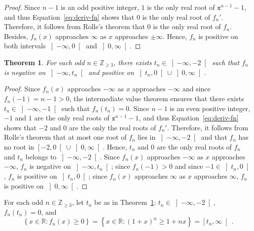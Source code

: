 \documentclass[12pt]{article}
\newcommand{\bZ}{\mathbb{Z}}
\newcommand{\bR}{\mathbb{R}}
\newcommand{\bN}[1]{\bZ_{\ge #1}}
\newcommand{\ttx}{\mathtt{x}}
\newtheorem{theorem}{Theorem}
\begin{document}
 \begin{proof}
   Since $n - 1$ is an odd positive integer,
   $1$ is the only real root of $\ttx^{n - 1} - 1$, 
   and thus Equation~\eqref{eq:deriv-fn} shows that $0$ is the only real root of $f_n'$.
   Therefore, it follows from Rolle's theorem that $0$ is the only real root of $f_n$.
   Besides, $f_n(x)$ approaches $\infty$ as $x$ approaches $\pm \infty$.
   Hence, $f_n$ is positive on both intervals $\left]- \infty, 0 \right[$ and $\left]0, \infty \right[$.
 \end{proof}

 
 \begin{theorem} \label{thm:n-is-odd}
   For each odd  $n \in \bN{3}$,
   there exists $t_n \in \left] - \infty, - 2 \right[$ such that $f_n$ is 
   negative on $\left]- \infty, t_n \right[$
   and
   positive on $\left]t_n, 0 \right[ \cup \left]0, \infty \right[$.
 \end{theorem} 

 \begin{proof}
   Since $f_n(x)$ approaches $- \infty$ as $x$ approaches $- \infty$
   and
   since $f_n(- 1) = n - 1 > 0$,
   the intermediate value theorem ensures that there exists $t_n \in \left]- \infty, -1 \right[$ such that $f_n(t_n) = 0$. 
   Since $n - 1$ is an even positive integer,
   $- 1$ and $1$ are the only real roots of $\ttx^{n - 1} - 1$,
   and thus Equation~\eqref{eq:deriv-fn} shows that $- 2$ and $0$ are the only the real roots of $f_n'$.
   Therefore, it follows from Rolle's theorem that
   at most one root of $f_n$ lies in $\left]- \infty, - 2 \right[$ and that
   $f_n$ has no root in $\left[- 2, 0 \right[ \cup \left]0,  \infty \right[$.
   Hence, $t_n$ and $0$ are the only real roots of $f_n$ and $t_n$ belongs to $\left]- \infty, - 2 \right[$.
   Since $f_n(x)$ approaches $- \infty$ as $x$ approaches $- \infty$,
   $f_n$ is negative on $\left]- \infty, t_n \right[$;
   since $f_n(- 1) > 0$ and since $- 1 \in \left]t_n, 0 \right[$,
   $f_n$ is positive on $\left]t_n, 0 \right[$; 
   since $f_n(x)$ approaches $\infty$ as $x$ approaches $\infty$,
   $f_n$ is positive on $\left]0, \infty \right[$.
 \end{proof}

 For each odd $n \in \bN{3}$,
 let $t_n$ be as in Theorem~\ref{thm:n-is-odd}:
 $t_n \in \left]- \infty, - 2 \right[$, $f_n(t_n) = 0$, and
 $$
 \left\{ x \in \bR : f_n(x) \ge 0 \right\}
 = \left\{ x \in \bR : {(1 + x)}^n \ge 1 + n x  \right\}
 = \left[t_n, \infty \right[ \, .
 $$
\end{document}
